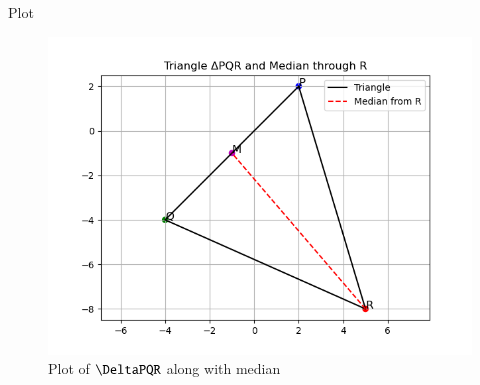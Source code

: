 \documentclass{beamer}
\begin{document}
\begin{frame}{Plot}
    \begin{figure}
        \centering
        \includegraphics[width=0.5\columnwidth]{../figs/plot.png}
        \caption{Plot of $\DeltaPQR$ along with median}
        \label{fig:fig}
    \end{figure}
\end{frame}
\end{document}
